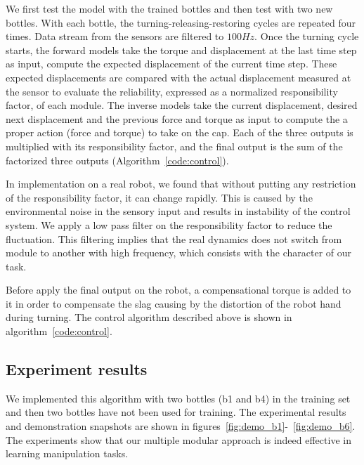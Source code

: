 We first test the model with the trained bottles and then test with two new bottles. With each bottle, the turning-releasing-restoring cycles are repeated four times. Data stream from the sensors are filtered to $100Hz$. Once the turning cycle starts, the forward models take the torque and displacement at the last time step as input, compute the expected displacement of the current time step. These expected displacements are compared with the actual displacement measured at the sensor to evaluate the reliability, expressed as a normalized responsibility factor, of each module. The inverse models take the current displacement, desired next displacement and the previous force and torque as input to compute the a proper action (force and torque) to take on the cap. Each of the three outputs is multiplied with its responsibility factor, and the final output is the sum of the factorized three outputs (Algorithm~\ref{code:control}).

In implementation on a real robot, we found that without putting any restriction of the responsibility factor, it can change rapidly. This is caused by the environmental noise in the sensory input and results in instability of the control system. We apply a low pass filter on the responsibility factor to reduce the fluctuation. This filtering implies that the real dynamics does not switch from module to another with high frequency, which consists with the character of our task. %


Before apply the final output on the robot, a compensational torque is added to it in order to compensate the slag causing by the distortion of the robot hand during turning. The control algorithm described above is shown in algorithm~\ref{code:control}.



\subsection{Experiment results}

We implemented this algorithm with two bottles (b1 and b4) in the training set and then two bottles have not been used for training. The experimental results and demonstration snapshots are shown in figures~\ref{fig:demo_b1}-~\ref{fig:demo_b6}. The experiments show that our multiple modular approach is indeed effective in learning manipulation tasks.

